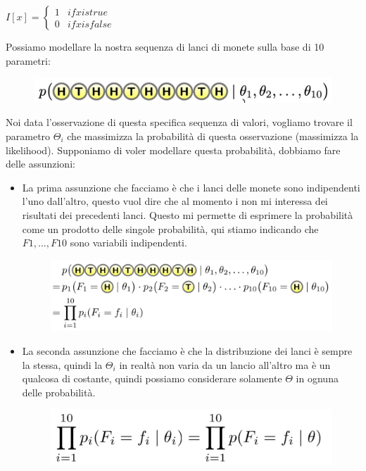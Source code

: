 \documentclass[14pt]{extreport}
\begin{document}
$I[x] = \begin{cases*} 1 & if  x is true  \\
                    0 & if 	x is false \end{cases*}$

Possiamo modellare la nostra sequenza di lanci di monete sulla base di 10 parametri:
\begin{figure}[H]
\centering
  \includegraphics[width=0.8\linewidth]{9.jpeg}
\end{figure}

Noi data l'osservazione di questa specifica sequenza di valori, vogliamo trovare il parametro $\Theta_i$ che massimizza la probabilità di questa
osservazione (massimizza la likelihood). Supponiamo di voler modellare questa probabilità, dobbiamo fare delle assunzioni:
\begin{itemize}
\item La prima assunzione che facciamo è che i lanci delle monete sono indipendenti l'uno dall'altro, questo vuol dire che al momento i non mi
interessa dei risultati dei precedenti lanci. Questo mi permette di esprimere la probabilità come un prodotto delle singole probabilità, qui stiamo
indicando che $F1,...,F10$ sono variabili indipendenti. 
\begin{figure}[H]
\centering
  \includegraphics[width=0.88\linewidth]{11.jpeg}
\end{figure}
\item La seconda assunzione che facciamo è che la distribuzione dei lanci è sempre la stessa, quindi la $\Theta_i$ in realtà non varia da un lancio
all'altro ma è un qualcosa di costante, quindi possiamo considerare solamente $\Theta$ in ognuna delle probabilità.
\begin{figure}[H]
\centering
  \includegraphics[width=0.5\linewidth]{13.jpeg}
\end{figure}
\end{itemize}
\end{document}

